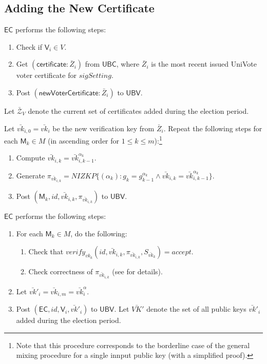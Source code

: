 \documentclass[bibtotoc,halfparskip,oneside]{scrreprt}
\newcommand{\eid}{\mathit{id}\xspace}
\newcommand{\vk}[1]{\mathit{vk}_{#1}\xspace}
\newcommand{\vkbar}[1]{\bar{\mathit{vk}}_{#1}\xspace}
\newcommand{\vkbarprime}[1]{\bar{\mathit{vk}}'_{#1}\xspace}
\newcommand{\EC}{\ensuremath{\mathsf{EC}}\xspace}
\newcommand{\UBC}{\ensuremath{\mathsf{UBC}}\xspace}
\newcommand{\UBV}{\ensuremath{\mathsf{UBV}}\xspace}
\newcommand{\Mixer}[1]{\ensuremath{\mathsf{M}_{#1}}\xspace}
\newcommand{\Voter}[1]{\ensuremath{\mathsf{V}_{#1}}\xspace}
\begin{document}
	\subsection{Adding the New Certificate}\label{adding}
	
	\EC performs the following steps:
	\begin{enumerate}
		\item Check if $\Voter{i}\in V$.
		\item Get $(\mathsf{certificate}:\bar{Z}_i)$ from \UBC, where $\bar{Z}_i$ is the most recent issued UniVote voter certificate for $\mathit{sigSetting}$.
		\item Post $(\mathsf{newVoterCertificate}:\bar{Z}_i)$ to \UBV. 
	\end{enumerate}
	Let $\bar{\mathcal{Z}}_V$ denote the current set of certificates added during the election period.
	
	Let $\vkbar{i,0}=\vkbar{i}$ be the new verification key from $\bar{Z}_i$. Repeat the following steps for each $\Mixer{k}\in M$ (in ascending order for $1\leq k\leq m$):\footnote{Note that this procedure corresponds to the borderline case of the general mixing procedure for a single innput public key (with a simplified proof).}
	\begin{enumerate}[resume]
		\item Compute $\vkbar{i,k}=\vkbar{i,k-1}^{\alpha_k}$.
		\	\item Generate $\pi_{\vkbar{i,k}}=\mathit{NIZKP}\{(\alpha_k):g_k=g_{k-1}^{\alpha_k}\wedge\vkbar{i,k}=\vkbar{i,k-1}^{\alpha_k}\}$.
		\item Post $(\Mixer{k},\eid,\vkbar{i,k},\pi_{\vkbar{i,k}})$ to \UBV.
	\end{enumerate}
	
	\EC performs the following steps:
	\begin{enumerate}[resume]
		\item For each $\Mixer{k}\in M$, do the following:
		\begin{enumerate}
			\item Check that $\mathit{verify}_{\vk{k}}(\eid,\vkbar{i,k},\pi_{\vkbar{i,k}},S_{\vkbar{k}})=\mathit{accept}$.
			\item Check correctness of $\pi_{\vkbar{i,k}}$ (see  for details).
		\end{enumerate}
		\item Let $\vkbarprime{i}=\vkbar{i,m}=\vkbar{i}^{\alpha}$.
		\item Post $(\EC,\eid,\Voter{i},\vkbarprime{i})$ to \UBV. Let $\bar{\mathit{VK}}'$ denote the set of all public keys $\vkbarprime{i}$ added during the election period.
	\end{enumerate}
	
\end{document}
